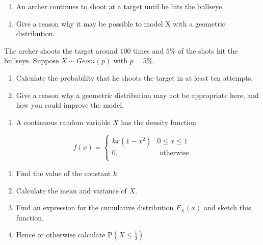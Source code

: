 \documentclass[
]{book}
\providecommand{\tightlist}{%
  \setlength{\itemsep}{0pt}\setlength{\parskip}{0pt}}
\theoremstyle{definition}
\theoremstyle{definition}
\theoremstyle{definition}
\theoremstyle{definition}
\theoremstyle{remark}
\begin{document}
\begin{enumerate}
\def\labelenumi{\arabic{enumi}.}
\tightlist
\item
  An archer continues to shoot at a target until he hits the bullseye.
\end{enumerate}

\begin{enumerate}
\def\labelenumi{\alph{enumi})}
\tightlist
\item
  Give a reason why it may be possible to model X with a geometric
  distribution.
\end{enumerate}

The archer shoots the target around \(100\) times and \(5\%\) of the shots hit the bullseye.
Suppose \(X \sim Geom(p)\) with \(p =5\%\).

\begin{enumerate}
\def\labelenumi{\alph{enumi})}
\setcounter{enumi}{1}
\item
  Calculate the probability that he shoots the target in at least ten attempts.
\item
  Give a reason why a geometric distribution may not be appropriate here, and how you could improve the model.
\end{enumerate}

\begin{enumerate}
\def\labelenumi{\arabic{enumi}.}
\setcounter{enumi}{1}
\tightlist
\item
  A continuous random variable \(X\) has the density function
\end{enumerate}

\begin{equation*}
  f(x)=\begin{cases}
        kx(1-x^2) & 0\leq x \leq 1 \\
        0 , &  \text{   otherwise}\\
  \end{cases}
\end{equation*}

\begin{enumerate}
\def\labelenumi{\alph{enumi})}
\item
  Find the value of the constant \(k\)
\item
  Calculate the mean and variance of \(X\).
\item
  Find an expression for the cumulative distribution \(F_X(x)\) and sketch this function.
\item
  Hence or otherwise calculate \(\text{P}(X\leq \frac{1}{3})\).
\end{enumerate}
\end{document}
